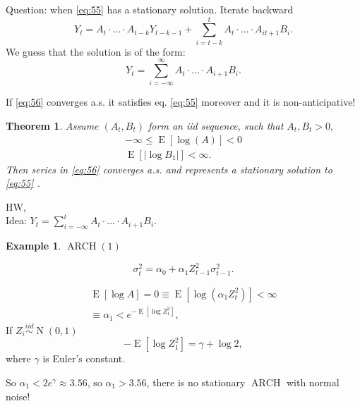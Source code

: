 \documentclass[12pt,a4paper, notitlepage]{book}
\theoremstyle{definition} %
\newtheorem{example}[definition]{Example}
\theoremstyle{plain} %
\newtheorem{theorem}[definition]{Theorem}
\DeclareMathOperator{\E}{E}
\DeclareMathOperator{\No}{N}
\DeclareMathOperator{\Arch}{ARCH}
\begin{document}
Question: when \ref{eq:55} has a stationary solution. Iterate backward
\[ Y_t = A_t \cdot \ldots \cdot A_{t-k} Y_{t-k-1} + \sum _{i=t-k}^t A_t \cdot \ldots \cdot A_{it+1}B_i . \]
We guess that the solution is of the form:
\[ Y_t = \sum _{i = - \infty}^{\infty} A_t \cdot \ldots \cdot A_{i + 1} B_i  . \label{eq:56} \]

If \ref{eq:56} converges a.s. it satisfies eq. \ref{eq:55} moreover and it is 
non-anticipative! 


\begin{theorem} Assume $ (A_t, B_t) $ form an iid sequence, such that $ A_t, B_t > 0,$
\begin{align*} 
- \infty \leq \E[ \log(A)] < 0 \\
\E[ |\log B_1|] < \infty .
\end{align*}
Then series in \ref{eq:56} converges a.s. and represents a stationary solution to \ref{eq:55} .
\end{theorem}
\proof HW, 
\\
Idea: $ Y_t = \sum_{i = - \infty}^t A_t \cdot \ldots \cdot A_{i+1} B_i . $ %
\endproof


\begin{example}  $ \Arch(1) $

\[ \sigma_t ^2 = \alpha_0 + \alpha_1 Z_{t-1}^2 \sigma_{t-1}^2 .\]

\begin{align*}
 \E[ \log A] = 0 \equiv \E[\log(\alpha_1 Z_t^2)] < \infty \\
\equiv \alpha_1 < e^{ - \E[\log Z_1^2] }  ,
\end{align*}
If $ Z_i \overset{iid}{\sim} \No(0,1) $
\[ - \E[\log Z_1^2] = \gamma + \log 2 , \]
where $ \gamma $ is Euler's constant.

So $ \alpha _1 < 2 e^{\gamma} \approx 3.56 $, so $ \alpha_1 > 3.56 $, there is no stationary $ \Arch $ with normal noise!

\end{example}
\end{document}
